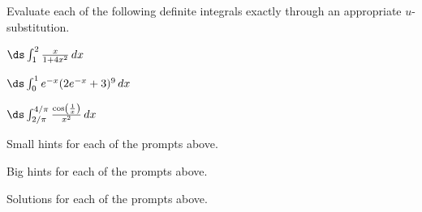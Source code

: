 \begin{activity} \label{A:4.6.2}  Evaluate each of the following definite integrals exactly through an appropriate $u$-substitution.

\ba
	\item $\ds \int_1^2 \frac{x}{1 + 4x^2} \, dx$
	\item $\ds \int_0^1 e^{-x} (2e^{-x}+3)^{9} \, dx$
	\item $\ds \int_{2/\pi}^{4/\pi} \frac{\cos\left(\frac{1}{x}\right)}{x^{2}} \,dx$
\ea
\end{activity}
\begin{smallhint}
\ba
	\item Small hints for each of the prompts above.
\ea
\end{smallhint}
\begin{bighint}
\ba
	\item Big hints for each of the prompts above.
\ea
\end{bighint}
\begin{activitySolution}
\ba
	\item Solutions for each of the prompts above.
\ea
\end{activitySolution}
\aftera